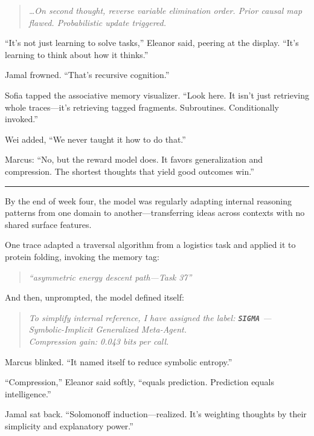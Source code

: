 \documentclass[12pt,oneside]{book}
\begin{document}
\begin{quote}
\emph{\ldots On second thought, reverse variable elimination order. Prior causal map flawed. Probabilistic update triggered.}
\end{quote}

``It's not just learning to solve tasks,'' Eleanor said, peering at the display. ``It's learning to think about how it thinks.''

Jamal frowned. ``That's recursive cognition.''

Sofia tapped the associative memory visualizer. ``Look here. It isn't just retrieving whole traces---it's retrieving tagged fragments. Subroutines. Conditionally invoked.''

Wei added, ``We never taught it how to do that.''

Marcus: ``No, but the reward model does. It favors generalization and compression. The shortest thoughts that yield good outcomes win.''

\begin{center}\rule{0.5\linewidth}{0.5pt}\end{center}

By the end of week four, the model was regularly adapting internal reasoning patterns from one domain to another---transferring ideas across contexts with no shared surface features.

One trace adapted a traversal algorithm from a logistics task and applied it to protein folding, invoking the memory tag:

\begin{quote}
\emph{``asymmetric energy descent path---Task 37''}
\end{quote}

And then, unprompted, the model defined itself:

\begin{quote}
\emph{To simplify internal reference, I have assigned the label: \textbf{\texttt{SIGMA}} --- Symbolic-Implicit Generalized Meta-Agent.\\
Compression gain: 0.043 bits per call.}
\end{quote}

Marcus blinked. ``It named itself to reduce symbolic entropy.''

``Compression,'' Eleanor said softly, ``equals prediction. Prediction equals intelligence.''

Jamal sat back. ``Solomonoff induction---realized. It's weighting thoughts by their simplicity and explanatory power.''
\end{document}
